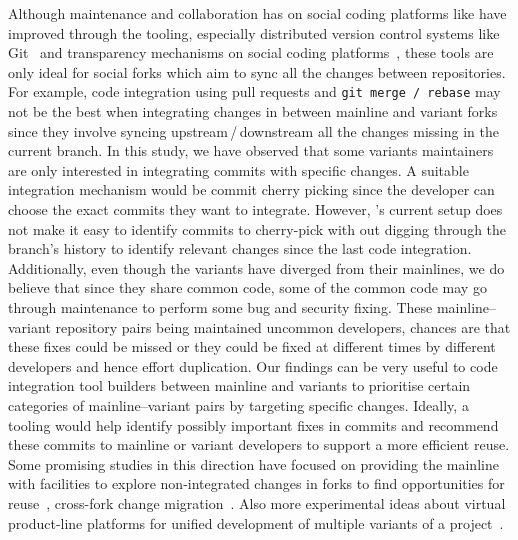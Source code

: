 Although maintenance and collaboration has on social coding platforms like \gh have improved through the tooling, especially distributed version
control systems like Git~\cite{Christian:MSR:2012} and transparency mechanisms on social coding platforms~\cite{Laura:2012:CSCW}, these tools are only ideal for social forks which aim to sync all the changes between repositories.
For example, code integration using pull requests and \texttt{git merge\,/\,rebase} may not be the best when integrating changes in between mainline and variant forks since they involve syncing upstream\,/\,downstream all the changes missing in the current branch. 
In this study, we have observed that some variants maintainers are only interested in integrating commits with specific changes. 
A suitable integration mechanism would be commit cherry picking since the developer can choose the exact commits they want to integrate.
However, \gh's current setup does not make it easy to identify commits to cherry-pick with out digging through the branch's history to identify relevant changes since the last code integration.
Additionally, even though the variants have diverged from their mainlines, we do believe that since they share common code, some of the common code may go through maintenance to perform some bug and security fixing. These mainline--variant repository pairs being maintained uncommon developers, chances are that these fixes could be missed or they could be fixed at different times by different developers and hence effort duplication. 
Our findings can be very useful to code integration tool builders between mainline and variants to prioritise certain categories of mainline--variant pairs by targeting specific changes. 
Ideally, a tooling would help identify possibly important fixes in commits and recommend these commits to mainline or variant developers to support a more efficient reuse. 
Some promising studies in this direction have focused on providing the mainline with facilities to explore non-integrated changes in forks to find opportunities for reuse~\cite{Ren:2018}, cross-fork change migration~\cite{ray:2013:ASE,Ren:2019}. Also more experimental ideas about virtual product-line platforms for unified development of multiple variants of a project~\cite{Antkiewicz:icse:2014,Fischer:saner:2014,Montalvillo:spl:2015,rubin:icse:2013,Stefan:2016:icsme}.


